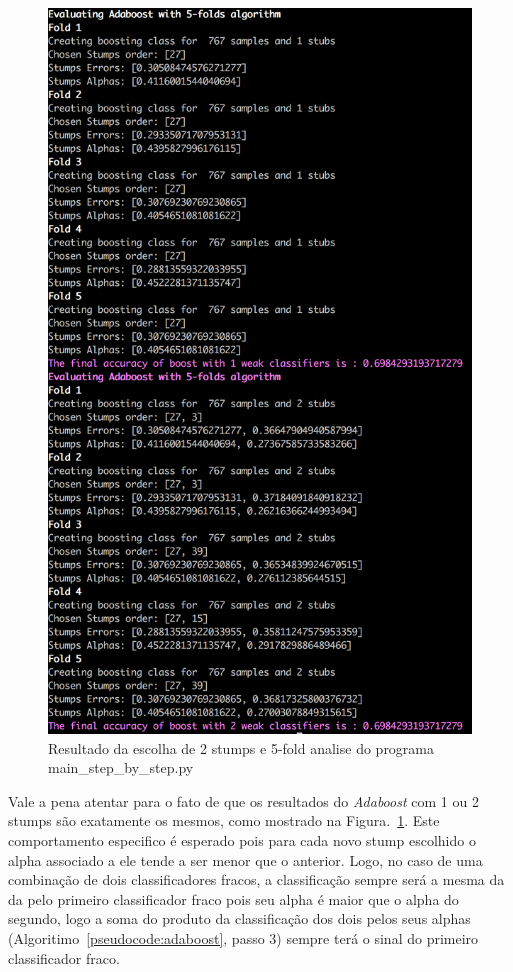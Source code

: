 \begin{figure}[h!]
  \includegraphics[width=\linewidth]{imgs/exemple_output2.png}
  \caption{Resultado da escolha de 2 stumps e 5-fold analise do programa main\_step\_by\_step.py}
	\label{fig:main2_2}
\end{figure}

Vale a pena atentar para o fato de que os resultados do \emph{Adaboost} com 1 ou 2 stumps são exatamente os mesmos, como mostrado na Figura.~\ref{fig:main2_2}. Este comportamento especifico é esperado pois para cada novo stump escolhido o alpha associado a ele tende a ser menor que o anterior. Logo, no caso de uma combinação de dois classificadores fracos, a classificação sempre será a mesma da da pelo primeiro classificador fraco pois seu alpha é maior que o alpha do segundo, logo a soma do produto da classificação dos dois pelos seus alphas (Algoritimo~\ref{pseudocode:adaboost}, passo 3) sempre terá o sinal do primeiro classificador fraco.


